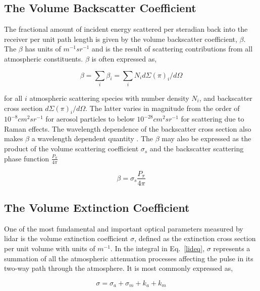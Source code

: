 \subsection{The Volume Backscatter Coefficient}

The fractional amount of incident energy scattered per steradian 
back into the receiver per unit path length is 
given by the volume backscatter coefficient,
$\beta$. The $\beta$ has units of ${m^{-1}}{sr^{-1}}$
and is the result of scattering contributions 
from all atmospheric constituents. $\beta$ is often
expressed as,

\begin{equation}
\beta = {\sum_{i}}{\beta_{i}} = 
{\sum_{i}}{N_{i}} d\Sigma {(\pi)_{i}}/d\Omega 
\label{backall}
\end{equation}

\noindent
for all $i$ atmospheric scattering species with number density $N_{i}$, 
and backscatter cross section $d\Sigma {(\pi)_{i}}/d\Omega$.
The latter varies in magnitude from the order of ${10^{-8}}{cm^{2}}{sr^{-1}}$
for aerosol particles to below ${10^{-28}}{cm^{2}}{sr^{-1}}$
for scattering due to Raman effects. The wavelength
dependence of the backscatter cross section also makes $\beta$ 
a wavelength dependent quantity \cite{agc}\cite{aic2}.
The $\beta$ may also be expressed as the product of the
volume scattering coefficient $\sigma_{s}$ and 
the backscatter scattering phase function $\frac{P_{\pi}}{4\pi}$

\begin{equation}
\beta = \sigma_{s}{\frac{P_{\pi}}{4\pi}}
\label{backall2}
\end{equation}
 
\subsection{The Volume Extinction Coefficient}

One of the most fundamental and important optical
parameters measured by lidar is the volume extinction coefficient
$\sigma$, defined as the extinction cross section
per unit volume with units of ${m^{-1}}$. 
In the integral in Eq.~{\ref{lideq}},
$\sigma$ represents a summation of all the atmospheric attenuation processes 
affecting the pulse in its two-way path through
the atmosphere. It is most commonly expressed as,

\begin{equation}
\sigma = {\sigma_{a}}+{\sigma_{m}}+{k_{a}}+{k_{m}}
\label{exall}
\end{equation}


